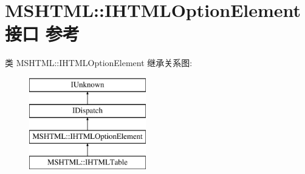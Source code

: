 \hypertarget{interface_m_s_h_t_m_l_1_1_i_h_t_m_l_option_element}{}\section{M\+S\+H\+T\+ML\+:\+:I\+H\+T\+M\+L\+Option\+Element接口 参考}
\label{interface_m_s_h_t_m_l_1_1_i_h_t_m_l_option_element}
类 M\+S\+H\+T\+ML\+:\+:I\+H\+T\+M\+L\+Option\+Element 继承关系图\+:\begin{figure}[H]
\begin{center}
\leavevmode
\includegraphics[height=4.000000cm]{interface_m_s_h_t_m_l_1_1_i_h_t_m_l_option_element}
\end{center}
\end{figure}
